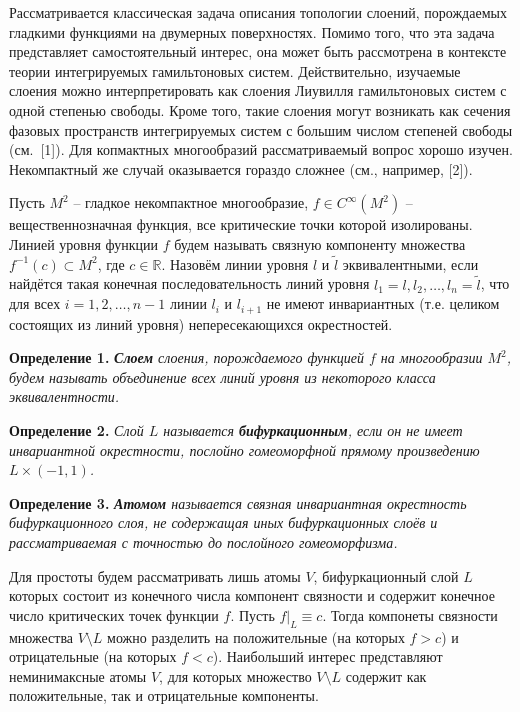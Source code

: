 



Рассматривается классическая задача описания топологии слоений, порождаемых гладкими функциями на двумерных поверхностях. Помимо того, что эта задача представляет самостоятельный интерес, она может быть рассмотрена в контексте теории интегрируемых гамильтоновых систем. Действительно, изучаемые слоения можно интерпретировать как слоения Лиувилля гамильтоновых систем с одной степенью свободы. Кроме того, такие слоения могут возникать как сечения фазовых пространств интегрируемых систем с большим числом степеней свободы (см.~[1]). Для копмактных многообразий рассматриваемый вопрос хорошо изучен. Некомпактный же случай оказывается гораздо сложнее (см., например, [2]).

Пусть $M^2$ -- гладкое некомпактное многообразие, $f\in C^\infty(M^2)$ -- вещественнозначная функция, все критические точки которой изолированы. Линией уровня функции $f$ будем называть связную компоненту множества $f^{-1}(c)\subset M^2$, где $c\in\mathbb R$. Назовём линии уровня $l$ и $\tilde l$ эквивалентными, если найдётся такая конечная последовательность линий уровня $l_1=l,l_2,\ldots,l_n=\tilde l$, что для всех $i=1,2,\ldots,n-1$ линии $l_i$ и $l_{i+1}$ не имеют инвариантных (т.е. целиком состоящих из линий уровня) непересекающихся окрестностей. %

\textbf{Определение 1.}
{\it \textbf{Слоем} слоения, порождаемого функцией $f$ на многообразии $M^2$, будем называть объединение всех линий уровня из некоторого класса эквивалентности.}

\textbf{Определение 2.}
{\it Слой $L$ называется \textbf{бифуркационным}, если он не имеет инвариантной окрестности, послойно гомеоморфной прямому произведению $L\times(-1,1)$.}

\textbf{Определение 3.}
{\it \textbf{Атомом} называется связная инвариантная окрестность бифуркационного слоя, не содержащая иных бифуркационных слоёв и рассматриваемая с точностью до послойного гомеоморфизма.}

Для простоты будем рассматривать лишь атомы $V$, бифуркационный слой $L$ которых состоит из конечного числа компонент связности и содержит конечное число критических точек функции $f$. Пусть $f|_L\equiv c$. Тогда компонеты связности множества $V\setminus L$ можно разделить на положительные (на которых $f>c$) и отрицательные (на которых $f<c$). Наибольший интерес представляют неминимаксные атомы $V$, для которых множество $V\setminus L$ содержит как положительные, так и отрицательные компоненты.

